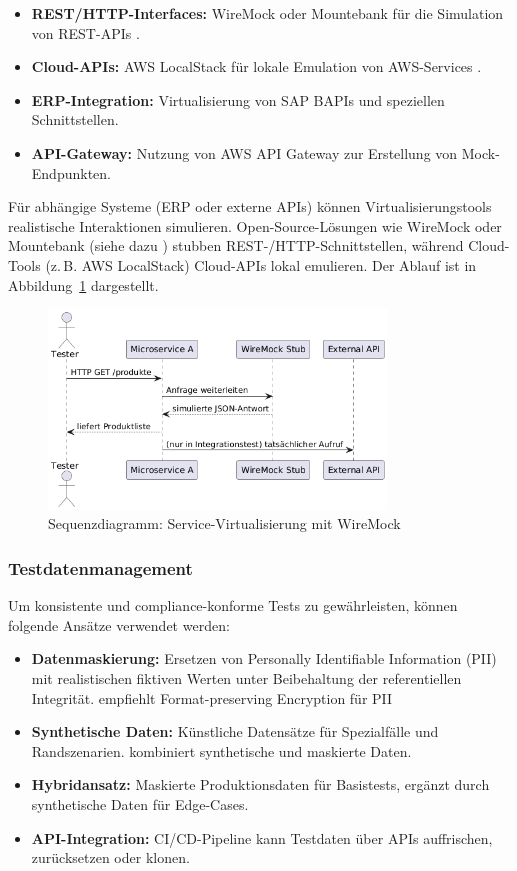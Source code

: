 \begin{itemize}
    \item \textbf{REST/HTTP-Interfaces:} WireMock oder Mountebank für die Simulation von REST-APIs
    \cite{wiremock2025}.
    \item \textbf{Cloud-APIs:} AWS LocalStack für lokale Emulation von AWS-Services \cite{aws2021}.
    \item \textbf{ERP-Integration:} Virtualisierung von SAP BAPIs und speziellen Schnittstellen.
    \item \textbf{API-Gateway:} Nutzung von AWS API Gateway zur Erstellung von Mock-Endpunkten.
\end{itemize}

Für abhängige Systeme (ERP oder externe APIs) können Virtualisierungstools realistische
Interaktionen simulieren. Open-Source-Lösungen wie WireMock oder Mountebank
(siehe dazu \citet{byars2018}) stubben REST-/HTTP-Schnittstellen, während Cloud-Tools
(z.\,B. AWS LocalStack) Cloud-APIs lokal emulieren. Der Ablauf ist in Abbildung~\ref{fig:sequence}
dargestellt.

\begin{figure}[h!]
    \centering
    \includegraphics[width=0.8\textwidth]{fig/servicevirti.png}
    \caption{Sequenzdiagramm: Service-Virtualisierung mit WireMock}
    \label{fig:sequence}
\end{figure}

\subsubsection{Testdatenmanagement}
Um konsistente und compliance-konforme Tests zu gewährleisten, können folgende Ansätze verwendet werden:

\begin{itemize}
    \item \textbf{Datenmaskierung:} Ersetzen von Personally Identifiable Information (PII) mit
    realistischen fiktiven Werten unter Beibehaltung der referentiellen Integrität. \citet{tricentis2024}
    empfiehlt Format-preserving Encryption für PII
    \item \textbf{Synthetische Daten:} Künstliche Datensätze für Spezialfälle und Randszenarien.
    \citet{browserstack2025} kombiniert synthetische und maskierte Daten.
    \item \textbf{Hybridansatz:} Maskierte Produktionsdaten für Basistests, ergänzt durch
    synthetische Daten für Edge-Cases.
    \item \textbf{API-Integration:} CI/CD-Pipeline kann Testdaten über APIs auffrischen,
    zurücksetzen oder klonen.
\end{itemize}

